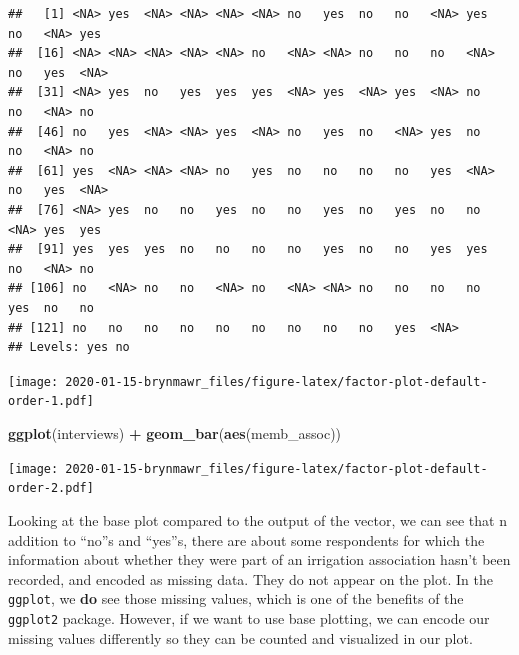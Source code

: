 \documentclass[]{book}
\newenvironment{Shaded}{\begin{snugshade}}{\end{snugshade}}
\newcommand{\KeywordTok}[1]{\textcolor[rgb]{0.13,0.29,0.53}{\textbf{#1}}}
\newcommand{\StringTok}[1]{\textcolor[rgb]{0.31,0.60,0.02}{#1}}
\newcommand{\OperatorTok}[1]{\textcolor[rgb]{0.81,0.36,0.00}{\textbf{#1}}}
\newcommand{\NormalTok}[1]{#1}
\begin{document}
\begin{verbatim}
##   [1] <NA> yes  <NA> <NA> <NA> <NA> no   yes  no   no   <NA> yes  no   <NA> yes 
##  [16] <NA> <NA> <NA> <NA> <NA> no   <NA> <NA> no   no   no   <NA> no   yes  <NA>
##  [31] <NA> yes  no   yes  yes  yes  <NA> yes  <NA> yes  <NA> no   no   <NA> no  
##  [46] no   yes  <NA> <NA> yes  <NA> no   yes  no   <NA> yes  no   no   <NA> no  
##  [61] yes  <NA> <NA> <NA> no   yes  no   no   no   no   yes  <NA> no   yes  <NA>
##  [76] <NA> yes  no   no   yes  no   no   yes  no   yes  no   no   <NA> yes  yes 
##  [91] yes  yes  yes  no   no   no   no   yes  no   no   yes  yes  no   <NA> no  
## [106] no   <NA> no   no   <NA> no   <NA> <NA> no   no   no   no   yes  no   no  
## [121] no   no   no   no   no   no   no   no   no   yes  <NA>
## Levels: yes no
\end{verbatim}

\begin{Shaded}
\end{Shaded}

\texttt{[image: 2020-01-15-brynmawr\_files/figure-latex/factor-plot-default-order-1.pdf]}

\begin{Shaded}
\begin{Highlighting}[]
\KeywordTok{ggplot}\NormalTok{(interviews) }\OperatorTok{+}\StringTok{ }\KeywordTok{geom_bar}\NormalTok{(}\KeywordTok{aes}\NormalTok{(memb_assoc))}
\end{Highlighting}
\end{Shaded}

\texttt{[image: 2020-01-15-brynmawr\_files/figure-latex/factor-plot-default-order-2.pdf]}

Looking at the base plot compared to the output of the vector, we can
see that n addition to ``no''s and ``yes''s, there are about some
respondents for which the information about whether they were part of an
irrigation association hasn't been recorded, and encoded as missing
data. They do not appear on the plot. In the \texttt{ggplot}, we
\textbf{do} see those missing values, which is one of the benefits of
the \texttt{ggplot2} package. However, if we want to use base plotting,
we can encode our missing values differently so they can be counted and
visualized in our plot.
\end{document}
